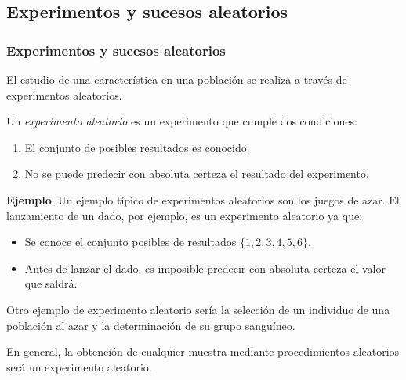 \subsection{Experimentos y sucesos aleatorios}

\begin{frame}
\frametitle{Experimentos y sucesos aleatorios}
El estudio de una característica en una población se realiza a través de experimentos aleatorios.

\begin{definicion} Un \emph{experimento aleatorio} es un experimento que cumple dos condiciones:
\begin{enumerate}
	\item El conjunto de posibles resultados es conocido.
	\item No se puede predecir con absoluta certeza el resultado del experimento.
\end{enumerate}
\end{definicion}

\textbf{Ejemplo}. Un ejemplo típico de experimentos aleatorios son los juegos de azar.
El lanzamiento de un dado, por ejemplo, es un experimento aleatorio ya que:
\begin{itemize}
\item Se conoce el conjunto posibles de resultados $\{1,2,3,4,5,6\}$.
\item Antes de lanzar el dado, es imposible predecir con absoluta certeza el valor que saldrá. 
\end{itemize}

Otro ejemplo de experimento aleatorio sería la selección de un individuo de una población al azar y la determinación de su grupo sanguíneo.

En general, la obtención de cualquier muestra mediante procedimientos aleatorios será un experimento aleatorio.

\end{frame}
